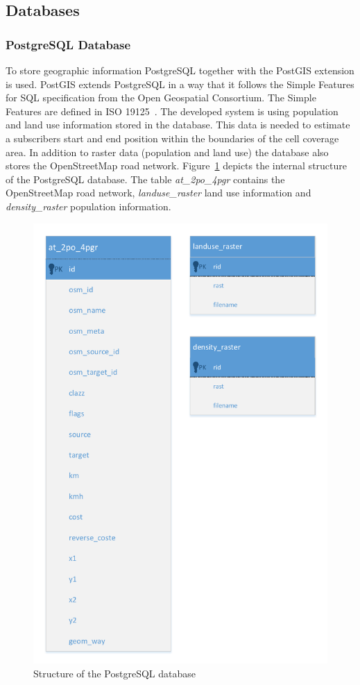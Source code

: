 \subsection{Databases}
\subsubsection{PostgreSQL Database}
To store geographic information PostgreSQL together with the PostGIS extension is used. PostGIS extends PostgreSQL in a way that it follows the Simple Features for SQL specification from the Open Geospatial Consortium. The Simple Features are defined in ISO 19125~\cite{ISO19125,ISO191252}. The developed system is using population and land use information stored in the database. This data is needed to estimate a subscribers start and end position within the boundaries of the cell coverage area. In addition to raster data (population and land use) the database also stores the OpenStreetMap road network. Figure~\ref{fig:pg_structure} depicts the internal structure of the PostgreSQL database. The table \emph{at_2po_4pgr} contains the OpenStreetMap road network, \emph{landuse_raster} land use information and \emph{density_raster} population information.
\begin{figure}
\centering
\includegraphics[width=0.7\linewidth]{./images/pg_structure}
\caption{Structure of the PostgreSQL database}
\label{fig:pg_structure}
\end{figure}

